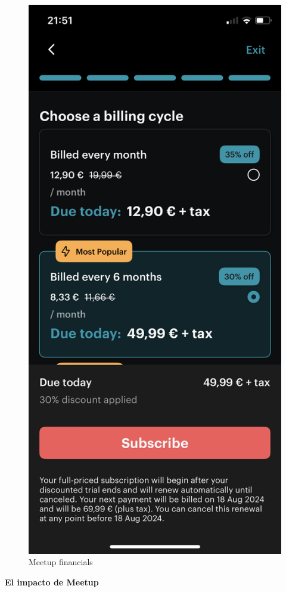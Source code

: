 \begin{figure}[H]
  \centering
  \includegraphics[cframe=black 2pt,width=0.3\linewidth]{images/estadodelarte/meetuporganizerprice.png}
  \caption{Meetup financials}
  \label{fig:meetup_financials}
\end{figure}

\textbf{El impacto de Meetup}

